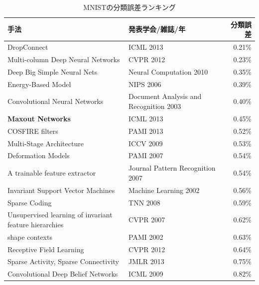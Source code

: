 \begin{table}[htbp]
\begin{center}
  \caption{MNISTの分類誤差ランキング}
    \begin{tabular}{|l|l|r|}\hline
    手法 & 発表学会/雑誌/年 & 分類誤差 \\ \hline
    DropConnect \cite{wan2013regularization}& ICML 2013 & 0.21\% \\ \hline
    Multi-column Deep Neural Networks \cite{ciresan2012multi-column}& CVPR 2012 & 0.23\% \\ \hline
    Deep Big Simple Neural Nets \cite{ciresan2010deep}& Neural Computation 2010 & 0.35\% \\ \hline
    Energy-Based Model \cite{poultney2006efficient}& NIPS 2006 & 0.39\% \\ \hline
    Convolutional Neural Networks \cite{simard2003best}& Document Analysis and Recognition 2003 & 0.40\% \\ \hline
    \textbf{Maxout Networks} \cite{goodfellow2013maxout}& ICML 2013 & 0.45\% \\ \hline
    COSFIRE filters \cite{azzopardi2013trainable}& PAMI 2013 & 0.52\% \\ \hline
    Multi-Stage Architecture \cite{jarrett2009what}& ICCV 2009 & 0.53\% \\ \hline
    Deformation Models \cite{keysers2007deformation}& PAMI 2007 & 0.54\% \\ \hline
    A trainable feature extractor \cite{lauer2007a-trainable}& Journal Pattern Recognition 2007   & 0.54\% \\ \hline
    Invariant Support Vector Machines \cite{decoste2002training}& Machine Learning 2002 & 0.56\% \\ \hline
    Sparse Coding \cite{labusch2008simple}& TNN 2008 & 0.59\% \\ \hline
    Unsupervised learning of invariant feature hierarchies \cite{ranzato2007unsupervised}& CVPR 2007 & 0.62\% \\ \hline
    shape contexts \cite{belongie2002shape}& PAMI 2002 & 0.63\% \\ \hline
    Receptive Field Learning \cite{jia2012beyond}& CVPR 2012 & 0.64\% \\ \hline
    Sparse Activity, Sparse Connectivity \cite{thom2013sparse}& JMLR 2013 & 0.75\% \\ \hline
    Convolutional Deep Belief Networks \cite{lee2009convolutional}& ICML 2009 & 0.82\% \\ \hline

\end{tabular}
\end{center}
\end{table}
